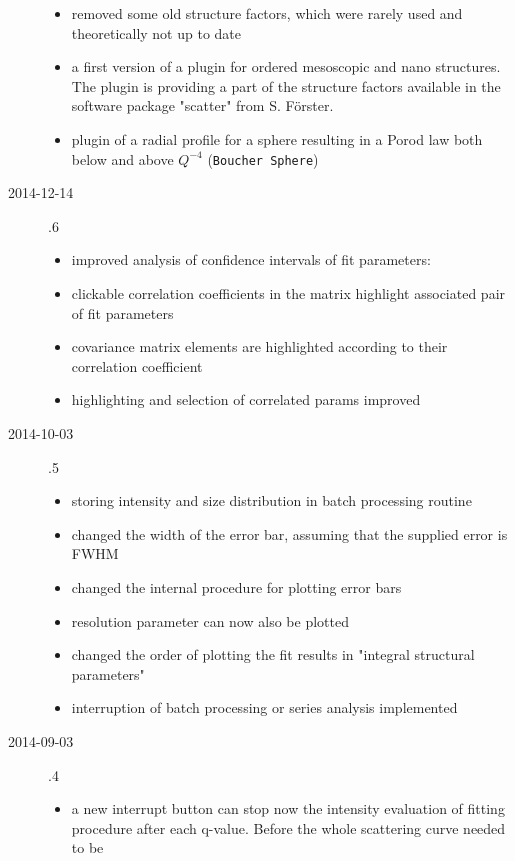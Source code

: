 \begin{description}
\begin{itemize}
        \item   removed some old structure factors,
                which were rarely used and theoretically not up to date
        \item   a first version of a plugin for ordered mesoscopic and nano structures.
                The plugin is providing a part of the structure factors available
                in the software package "scatter" from S. Förster.
        \item   plugin of a radial profile for a sphere resulting in a Porod law both below and above $Q^{-4}$ (\texttt{Boucher Sphere})
    \end{itemize}
\item[2014-12-14] .6
    \begin{itemize}
        \item improved analysis of confidence intervals of fit parameters:
        \item clickable correlation coefficients in the matrix highlight associated
             pair of fit parameters
        \item covariance matrix elements are highlighted according to their correlation
            coefficient
        \item highlighting and selection of correlated params improved
    \end{itemize}
\item[2014-10-03] .5
    \begin{itemize}
        \item storing intensity and size distribution in batch processing routine
        \item changed the width of the error bar, assuming that the supplied error is FWHM
        \item changed the internal procedure for plotting error bars
        \item resolution parameter can now also be plotted
        \item changed the order of plotting the fit results
            in "integral structural parameters"
        \item interruption of batch processing or series analysis implemented
    \end{itemize}
\item[2014-09-03] .4
    \begin{itemize}
    \item a new interrupt button can stop now the intensity evaluation of fitting
        procedure after each q-value. Before the whole scattering curve needed to be

\end{itemize}
\end{description}
